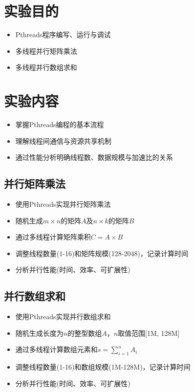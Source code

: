 \documentclass{SYSUReport}
\date{2025年4月9日}
\begin{document}
\cover
\thispagestyle{empty}
\clearpage

\section{实验目的}
\begin{itemize}
    \item Pthreads程序编写、运行与调试
    \item 多线程并行矩阵乘法
    \item 多线程并行数组求和
\end{itemize}

\section{实验内容}
\begin{itemize}
    \item 掌握Pthreads编程的基本流程
    \item 理解线程间通信与资源共享机制
    \item 通过性能分析明确线程数、数据规模与加速比的关系
\end{itemize}
\subsection{并行矩阵乘法}
\begin{itemize}
    \item 使用Pthreads实现并行矩阵乘法
    \item 随机生成$m \times n$的矩阵$A$及$n \times k$的矩阵$B$
    \item 通过多线程计算矩阵乘积$C = A \times B$
    \item 调整线程数量(1-16)和矩阵规模(128-2048)，记录计算时间
    \item 分析并行性能(时间、效率、可扩展性)
\end{itemize}
\subsection{并行数组求和}
\begin{itemize}
    \item 使用Pthreads实现并行数组求和
    \item 随机生成长度为$n$的整型数组$A$，$n$取值范围[1M, 128M]
    \item 通过多线程计算数组元素和$s = \sum_{i=1}^{n}A_i$
    \item 调整线程数量(1-16)和数组规模(1M-128M)，记录计算时间
    \item 分析并行性能(时间、效率、可扩展性)
\end{itemize}
\end{document}
